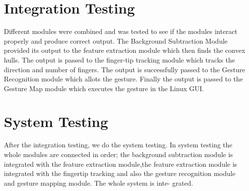 \documentclass[11pt]{report}
\begin{document}
\section{Integration Testing}

Different modules were combined and was tested to see if the modules interact properly and produce
correct output. The Background Subtraction Module provided its output to the feature extraction module
which then finds the convex hulls. The output is passed to the finger-tip tracking module which tracks the 
direction and number of fingers. The output is successfully passed to the Gesture Recognition module which allots the gesture.
Finally the output is passed to the Gesture Map module which executes the gesture in the Linux GUI.

\section{System Testing}

After the integration testing, we do the system testing. In system testing the whole modules are
connected in order; the background subtraction module is integrated with the feature extraction module,the
feature extraction module is integrated with the fingertip tracking and also the gesture recognition
module and gesture mapping module. The whole system is inte-
grated.
\end{document}
